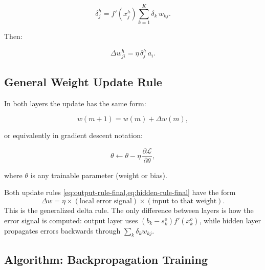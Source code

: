 \documentclass[12pt,a4paper]{article}
\newcommand{\pd}[2]{\frac{\partial #1}{\partial #2}}
\newcommand{\wji}{w_{ji}^{h}}
\newcommand{\wkj}{w_{kj}}
\newcommand{\sko}{s_{k}^{o}}
\newcommand{\deltak}{\delta_{k}}
\newcommand{\deltajh}{\delta_{j}^{h}}
\newcommand{\xho}{x_{j}^{h}}
\newcommand{\xko}{x_{k}^{o}}
\begin{document}
\begin{equation}
  \deltajh = f'(\xho)\sum_{k=1}^{K}\deltak\,\wkj.
  \label{eq:delta-j-h}
\end{equation}

Then:

\begin{equation}
  \boxed{\Delta\wji = \eta\,\deltajh\,a_i.}
  \label{eq:hidden-rule-final}
\end{equation}

\subsection{General Weight Update Rule}

In both layers the update has the same form:

\begin{equation}
  w(m+1) = w(m) + \Delta w(m),
  \label{eq:general-update}
\end{equation}

or equivalently in gradient descent notation:

\begin{equation}
  \theta \leftarrow \theta - \eta\,\pd{\mathcal{L}}{\theta},
  \label{eq:gd-step}
\end{equation}

where $\theta$ is any trainable parameter (weight or bias).

\begin{keyinsight}[title=Structural Symmetry of Backpropagation]
Both update rules \cref{eq:output-rule-final,eq:hidden-rule-final} have the
form
\[
  \Delta w = \eta \times (\text{local error signal}) \times (\text{input to that weight}).
\]
This is the generalized delta rule.  The only difference between layers is how
the error signal is computed: output layer uses $(b_k - \sko)f'(\xko)$,
while hidden layer propagates errors backwards through $\sum_k \deltak\wkj$.
\end{keyinsight}

\subsection{Algorithm: Backpropagation Training}
\label{sub:backprop-algo}
\end{document}
